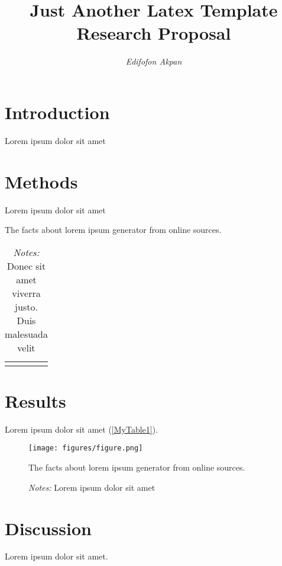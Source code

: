 \documentclass[12pt]{article}
\title{\LARGE \bfseries \vspace{-1cm} Just Another Latex Template \\
    \LARGE \normalfont Research Proposal}
\author{\Large \textit{Edifofon Akpan}}
\date{ }
\begin{document}
\fontsize{13pt}{15pt}\selectfont

\maketitle


\section{Introduction}
Lorem ipsum dolor sit amet

\section{Methods}
Lorem ipsum dolor sit amet 

\hspace{1em}

\begin{table}[H]
    \centering 
    \caption{The facts about lorem ipsum generator from online sources.}
    \begin{tabular}{|C{2cm}|L{10cm}|C{2.5cm}|}
        \hline
    \end{tabular}
    \label{MyTable1}
    \caption*{\footnotesize \textit{Notes:} Donec sit amet viverra justo. Duis malesuada velit}
\end{table}


\section{Results}
Lorem ipsum dolor sit amet (\autoref{MyTable1}). 

\hspace{1em}

\begin{figure}[H]
    \centering
    \texttt{[image: figures/figure.png]}
    \caption{The facts about lorem ipsum generator from online sources.}
    \label{fig:enter-label}
    \caption*{\footnotesize \textit{Notes:} Lorem ipsum dolor sit amet}
\end{figure}

\section{Discussion}
Lorem ipsum dolor sit amet.\parencite{akpan_cost-effectiveness_2022}



\clearpage
\newrefcontext[sorting=nyt]
\printbibliography
\end{document}
